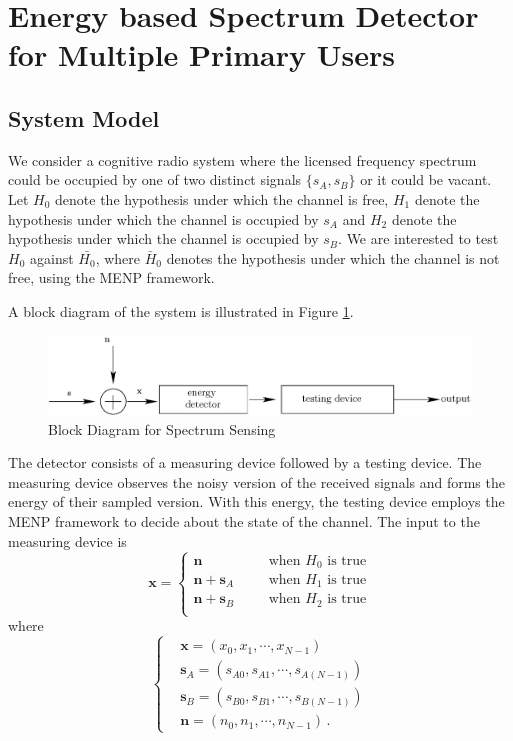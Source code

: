 \section{Energy based Spectrum Detector for Multiple Primary Users}
\subsection{System Model}
We consider a cognitive radio system where the licensed frequency spectrum could be occupied by one of two distinct signals $\{s_A, s_B\}$ or it could be vacant. Let $H_0$ denote the hypothesis under which the channel is free, ${H}_1$ denote the hypothesis under which the channel is occupied by $s_A$ and ${H}_2$ denote the hypothesis under which the channel is occupied by $s_B$. We are interested to test $H_0$ against $\bar{{H}_0}$, where $\bar{H}_0$ denotes the hypothesis under which the channel is not free, using the MENP framework.

A block diagram of the system is illustrated in Figure \ref{pic: block diagram}.

\begin{figure}[!hbp]
\centering
\includegraphics[width = \textwidth]{4/fig4.eps}
\caption{Block Diagram for Spectrum Sensing}
\label{pic: block diagram}
\end{figure}

The detector consists of a measuring device followed by a testing device. 
The measuring device observes the noisy version of the received signals and forms the energy of their sampled version.
With this energy, the testing device employs the MENP framework to decide about the state of the channel.
The input to the measuring device is 
\begin{equation}
  \mathbf{x} = \begin{cases}
	\mathbf{n}\;\;\;\;\;\;&\text{when $H_0$ is true}\\
	\mathbf{n}+\mathbf{s}_A\;\;\;\;\;\;&\text{when $H_1$ is true}\\
	\mathbf{n}+\mathbf{s}_B\;\;\;\;\;\;&\text{when $H_2$ is true}\\
  \end{cases}
  \label{equ:1222n0}
\end{equation}
where 
\begin{equation}
  \begin{cases}
	&\mathbf{x} = (x_0, x_1, \cdots, x_{N-1})\\
	&\mathbf{s}_A = (s_{A0}, s_{A1}, \cdots, s_{A(N-1)})\\
	&\mathbf{s}_B = (s_{B0}, s_{B1}, \cdots, s_{B(N-1)})\\
	&\mathbf{n} = (n_{0}, n_{1}, \cdots, n_{N-1})\,.
  \end{cases}
  \label{1222n1}
\end{equation}

